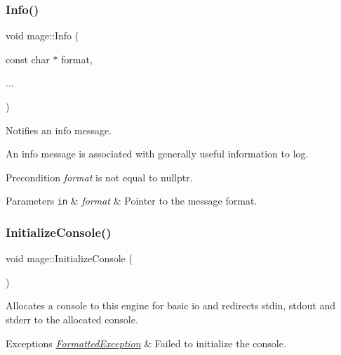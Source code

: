 \subsubsection{\texorpdfstring{Info()}{Info()}}
{\footnotesize\ttfamily void mage\+::\+Info (\begin{DoxyParamCaption}\item[{const char $\ast$}]{format,  }\item[{}]{... }\end{DoxyParamCaption})}

Notifies an info message.

An info message is associated with generally useful information to log.

\begin{DoxyPrecond}{Precondition}
{\itshape format} is not equal to {\ttfamily nullptr}. 
\end{DoxyPrecond}

\begin{DoxyParams}[1]{Parameters}
\mbox{\tt in}  & {\em format} & Pointer to the message format. \\
\hline
\end{DoxyParams}
\hypertarget{namespacemage_a587146c8cbeed655be16ddff8435c05c}{}\label{namespacemage_a587146c8cbeed655be16ddff8435c05c} 
\subsubsection{\texorpdfstring{Initialize\+Console()}{InitializeConsole()}}
{\footnotesize\ttfamily void mage\+::\+Initialize\+Console (\begin{DoxyParamCaption}{ }\end{DoxyParamCaption})}

Allocates a console to this engine for basic io and redirects stdin, stdout and stderr to the allocated console.


\begin{DoxyExceptions}{Exceptions}
{\em \hyperlink{structmage_1_1_formatted_exception}{Formatted\+Exception}} & Failed to initialize the console. \\
\hline
\end{DoxyExceptions}
\hypertarget{namespacemage_ac89935dc54be6ddaa1cc35e9dafdc302}{}\label{namespacemage_ac89935dc54be6ddaa1cc35e9dafdc302} 

